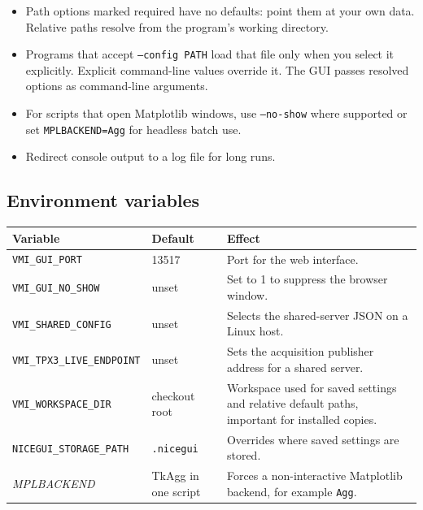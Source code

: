 \documentclass[11pt,a4paper]{article}
\newcommand{\code}[1]{\texttt{#1}}
\begin{document}
\begin{itemize}
  \item Path options marked required have no defaults: point them at your own
        data. Relative paths resolve from the program's working directory.
  \item Programs that accept \code{--config PATH} load that file only when
        you select it explicitly. Explicit command-line values override it.
        The GUI passes resolved options as command-line arguments.
  \item For scripts that open Matplotlib windows, use \code{--no-show}
        where supported or set \code{MPLBACKEND=Agg} for headless batch use.
  \item Redirect console output to a log file for long runs.
\end{itemize}

\subsection{Environment variables}

\begin{center}
\footnotesize
\begin{tabular}{@{}llp{8.6cm}@{}}
\toprule
Variable & Default & Effect \\
\midrule
\code{VMI\_\allowbreak{}GUI\_\allowbreak{}PORT} & 13517 & Port for the web interface. \\
\code{VMI\_\allowbreak{}GUI\_\allowbreak{}NO\_\allowbreak{}SHOW} & unset & Set to 1 to suppress the browser window. \\
\code{VMI\_\allowbreak{}SHARED\_\allowbreak{}CONFIG} & unset & Selects the shared-server JSON on a Linux host. \\
\code{VMI\_\allowbreak{}TPX3\_\allowbreak{}LIVE\_\allowbreak{}ENDPOINT} & unset & Sets the acquisition publisher address for a shared server. \\
\code{VMI\_\allowbreak{}WORKSPACE\_\allowbreak{}DIR} & checkout root & Workspace used for saved
settings and relative default paths, important for installed copies. \\
\code{NICEGUI\_\allowbreak{}STORAGE\_\allowbreak{}PATH} & \code{.\allowbreak{}nicegui} & Overrides where saved
settings are stored. \\
\emph{MPLBACKEND} & TkAgg in one script & Forces a non-interactive Matplotlib
backend, for example \code{Agg}. \\
\bottomrule
\end{tabular}
\end{center}
\end{document}
